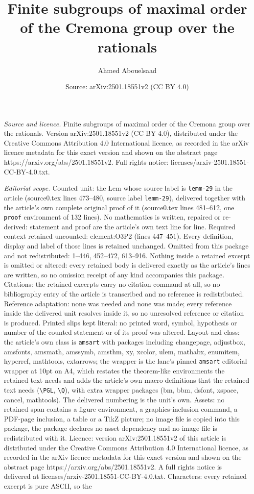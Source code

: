 \documentclass[10pt,a4paper]{amsart}
\title[Finite subgroups of maximal order of the Cremona group over ]{Finite subgroups of maximal order of the Cremona group over the rationals}
\author{Ahmed Abouelsaad}
\date{Source: arXiv:2501.18551v2 (CC BY 4.0)}
\begin{document}
\maketitle

\noindent\emph{Source and licence.} Finite subgroups of maximal order of the Cremona group over the rationals. Version arXiv:2501.18551v2 (CC BY 4.0), distributed under the Creative Commons Attribution 4.0 International licence, as recorded in the arXiv licence metadata for this exact version and shown on the abstract page https://arxiv.org/abs/2501.18551v2. Full rights notice: licenses/arxiv-2501.18551-CC-BY-4.0.txt.\par\smallskip

\noindent\textit{Editorial scope.} Counted unit: the Lem whose source label is \texttt{lemm-29} in the article (source0.tex lines 473--480, source label \texttt{lemm-29}), delivered together with the article's own complete original proof of it (source0.tex lines 481--612, one \texttt{proof} environment of 132 lines). No mathematics is written, repaired or re-derived: statement and proof are the article's own text line for line. Required context retained uncounted: element:O3P2 (lines 447--451). Every definition, display and label of those lines is retained unchanged. Omitted from this package and not redistributed: 1--446, 452--472, 613--916. Nothing inside a retained excerpt is omitted or altered: every retained body is delivered exactly as the article's lines are written, so no omission receipt of any kind accompanies this package. Citations: the retained excerpts carry no citation command at all, so no bibliography entry of the article is transcribed and no reference is redistributed. Reference adaptation: none was needed and none was made; every reference inside the delivered unit resolves inside it, so no unresolved reference or citation is produced. Printed slips kept literal: no printed word, symbol, hypothesis or number of the counted statement or of its proof was altered. Layout and class: the article's own class is \texttt{amsart} with packages including changepage, adjustbox, amsfonts, amsmath, amssymb, amsthm, xy, xcolor, ulem, mathabx, enumitem, hyperref, mathtools, extarrows; the wrapper is the lane's pinned \texttt{amsart} editorial wrapper at 10pt on A4, which restates the theorem-like environments the retained text needs and adds the article's own macro definitions that the retained text needs (\texttt{\textbackslash PGL}, \texttt{\textbackslash Q}), with extra wrapper packages (bm, bbm, dsfont, xspace, cancel, mathtools). The delivered numbering is the unit's own. Assets: no retained span contains a figure environment, a graphics-inclusion command, a PDF-page inclusion, a table or a TikZ picture; no image file is copied into this package, the package declares no asset dependency and no image file is redistributed with it. Licence: version arXiv:2501.18551v2 of this article is distributed under the Creative Commons Attribution 4.0 International licence, as recorded in the arXiv licence metadata for this exact version and shown on the abstract page https://arxiv.org/abs/2501.18551v2. A full rights notice is delivered at licenses/arxiv-2501.18551-CC-BY-4.0.txt. Characters: every retained excerpt is pure ASCII, so the 
\end{document}
